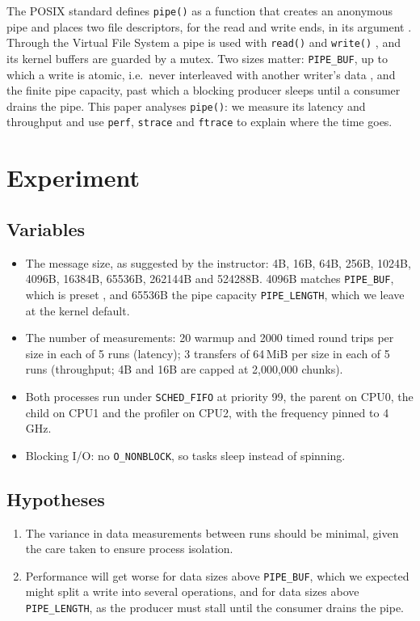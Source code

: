 \documentclass[11pt,sigconf,nonacm]{acmart}
\begin{document}
The POSIX standard defines \texttt{pipe()} as a function that creates an anonymous pipe and places two file descriptors, for the read and write ends, in its argument \cite{posix2024}. Through the Virtual File System a pipe is used with \texttt{read()} and \texttt{write()} \cite{LinuxVfsDocs,slideshare_linux_pipes}, and its kernel buffers are guarded by a mutex. Two sizes matter: \texttt{PIPE\_BUF}, up to which a write is atomic, i.e.\ never interleaved with another writer's data \cite{linux_man_pipe7}, and the finite pipe capacity, past which a blocking producer sleeps until a consumer drains the pipe. This paper analyses \texttt{pipe()}: we measure its latency and throughput and use \texttt{perf}, \texttt{strace} and \texttt{ftrace} to explain where the time goes.

\section{Experiment}

\subsection{Variables}

\begin{itemize}
    \item The message size, as suggested by the instructor: 4B, 16B, 64B, 256B, 1024B, 4096B, 16384B, 65536B, 262144B and 524288B. 4096B matches \texttt{PIPE\_BUF}, which is preset \cite{linux_limits_h}, and 65536B the pipe capacity \texttt{PIPE\_LENGTH}, which we leave at the kernel default.
    \item The number of measurements: 20 warmup and 2000 timed round trips per size in each of 5 runs (latency); 3 transfers of 64\,MiB per size in each of 5 runs (throughput; 4B and 16B are capped at 2,000,000 chunks).
    \item Both processes run under \texttt{SCHED\_FIFO} at priority 99, the parent on CPU0, the child on CPU1 and the profiler on CPU2, with the frequency pinned to 4 GHz.
    \item Blocking I/O: no \texttt{O\_NONBLOCK}, so tasks sleep instead of spinning.
\end{itemize}

\subsection{Hypotheses}

\begin{enumerate}
    \renewcommand{\labelenumi}{\arabic{enumi}.}
    \item The variance in data measurements between runs should be minimal, given the care taken to ensure process isolation.
    \item Performance will get worse for data sizes above \texttt{PIPE\_BUF}, which we expected might split a write into several operations, and for data sizes above \texttt{PIPE\_LENGTH}, as the producer must stall until the consumer drains the pipe.
\end{enumerate}
\end{document}
